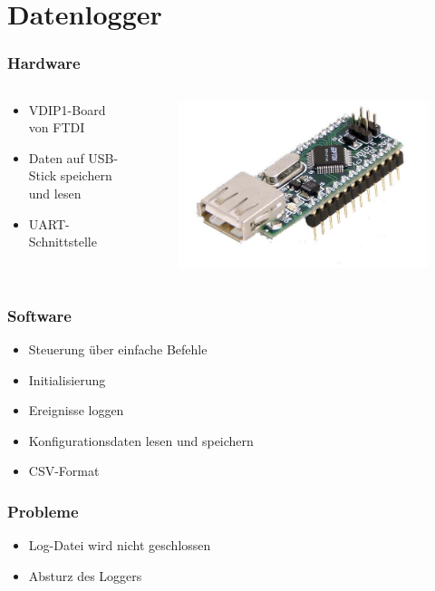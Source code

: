 \section{Datenlogger}

\begin{frame}
	\frametitle{Hardware}	
	\begin{columns}
		\begin{column}{0.6 \textwidth}
			\begin{itemize}
				\item VDIP1-Board von FTDI
				\item Daten auf USB-Stick speichern und lesen
				\item UART-Schnittstelle
			\end{itemize}
		\end{column}
		\begin{column}{0.4 \textwidth}
			\vspace{-2.8em}
			\begin{figure}[h]
				\centering
				\includegraphics[width = 0.8 \textwidth]{../images/vdip1.jpg}
			\end{figure}
		\end{column}
	\end{columns}
\end{frame}

\begin{frame}
	\frametitle{Software}	
	\begin{itemize}
		\item Steuerung über einfache Befehle
		\item Initialisierung
		\item Ereignisse loggen
		\item Konfigurationsdaten lesen und speichern
		\item CSV-Format
	\end{itemize}
\end{frame}

\begin{frame}	
	\frametitle{Probleme}
	\begin{itemize}
		\item Log-Datei wird nicht geschlossen
		\item Absturz des Loggers
	\end{itemize}
	
\end{frame}
